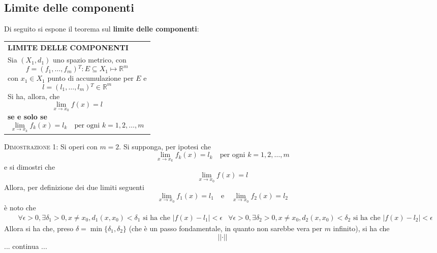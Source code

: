 \documentclass[a4paper]{extarticle}
\renewcommand\arraystretch{}
\begin{document}
\vspace{1em}
\noindent
\subsection{Limite delle componenti}
Di seguito si espone il teorema sul \textbf{limite delle componenti}:

\vspace{1em}
\setlength{\tabcolsep}{14pt}
\renewcommand{\arraystretch}{2}
\noindent
\begin{tabularx}{\textwidth}{@{}|P|@{}}
    \hline
    {\textbf{LIMITE DELLE COMPONENTI}}\\
    \parbox{\linewidth}{Sia $(X_1,d_1)$ uno spazio metrico, con
    \[f=(f_1,\dots,f_m){^T} : E \subseteq X_1 \longmapsto \mathbb{R}^m\]
    con $x_1 \in X_1$ punto di accumulazione per $E$ e
    \[l = (l_1,\dots,l_m){^T} \in \mathbb{R}^m\]
    Si ha, allora, che
    \[\lim_{x \to x_0} f(x) = l\]
    \textbf{se e solo se}
    \[\lim_{x \to x_k} f_k(x) = l_k \hspace{1em} \text{per ogni } k =1,2,\dots,m\]
     \vspace{-1mm}}\\
    \hline
\end{tabularx}

\vspace{2em}
\noindent
\normalfont \normalsize
\textsc{Dimostrazione 1}: Si operi con $m=2$. Si supponga, per ipotesi che
\[\lim_{x \to x_k} f_k(x) = l_k \hspace{1em} \text{per ogni } k =1,2,\dots,m\]
e si dimostri che
\[\lim_{x \to x_0} f(x) = l\]
Allora, per definizione dei due limiti seguenti
\[\lim_{x \to x_0} f_1(x) = l_1 \hspace{1em} \text{e} \hspace{1em} \lim_{x \to x_0} f_2(x) = l_2\]
è noto che
\begin{align*}
    &\forall \epsilon>0, \exists \delta_1 > 0, x \neq x_0, d_1(x,x_0) < \delta_1 \text{ si ha che } \left \vert f(x) - l_1 \right \vert < \epsilon
    &\forall \epsilon>0, \exists \delta_2 > 0, x \neq x_0, d_2(x,x_0) < \delta_2 \text{ si ha che } \left \vert f(x) - l_2 \right \vert < \epsilon
\end{align*}
Allora si ha che, preso $\delta = \min\{\delta_1,\delta_2\}$ (che è un passo fondamentale, in quanto non sarebbe vera per $m$ infinito), si ha che
\[\left \vert \left \vert \cdot \right \vert \right \vert\]
... continua ...
\end{document}

